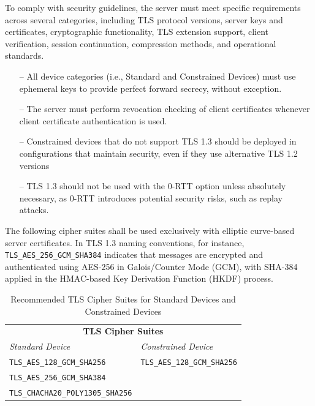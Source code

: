 \documentclass[pdflatex,sn-mathphys-num]{sn-jnl}%
\theoremstyle{thmstyleone}%
\theoremstyle{thmstyletwo}%
\theoremstyle{thmstylethree}%
\begin{document}
To comply with security guidelines, the server must meet specific requirements across several categories, including TLS protocol versions, server keys and certificates, cryptographic functionality, TLS extension support, client verification, session continuation, compression methods, and operational standards.

\begin{itemize}
    \item[--] All device categories (i.e., Standard and Constrained Devices) must use ephemeral keys to provide perfect forward secrecy, without exception. 
    \item[--] The server must perform revocation checking of client certificates whenever client certificate authentication is used. 
    \item[--] Constrained devices that do not support TLS 1.3 should be deployed in configurations that maintain security, even if they use alternative TLS 1.2 versions
    \item[--] TLS 1.3 should not be used with the 0-RTT option unless absolutely necessary, as 0-RTT introduces potential security risks, such as replay attacks. 
\end{itemize}

The following cipher suites shall be used exclusively with elliptic curve-based server certificates. In TLS 1.3 naming conventions, for instance, \texttt{TLS\_AES\_256\_GCM\_SHA384} indicates that messages are encrypted and authenticated using AES-256 in Galois/Counter Mode (GCM), with SHA-384 applied in the HMAC-based Key Derivation Function (HKDF) process.



\begin{table}[h!]
    \centering
    \small
    \begin{tabular}{@{}p{} p{}@{}}
        \hline
        \multicolumn{2}{c}{\textbf{TLS Cipher Suites}} \\
        \textit{Standard Device} & \textit{Constrained Device} \\
        \hline
        \texttt{TLS\_AES\_128\_GCM\_SHA256} & \texttt{TLS\_AES\_128\_GCM\_SHA256} \\
        \texttt{TLS\_AES\_256\_GCM\_SHA384} & \\
        \texttt{TLS\_CHACHA20\_POLY1305\_SHA256} & \\
        \hline
    \end{tabular}
    \caption{Recommended TLS Cipher Suites for Standard Devices and Constrained Devices}
    \label{tab:tls_cipher_recom}
\end{table}
\end{document}
